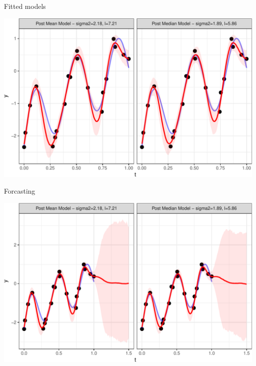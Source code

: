 \documentclass[11pt,ignorenonframetext,]{beamer}
\begin{document}
\begin{frame}{%
\protect\hypertarget{fitted-models}{%
Fitted models}}

\begin{center}\includegraphics[width=\textwidth]{Lec12_files/figure-beamer/unnamed-chunk-20-1} \end{center}

\end{frame}

\begin{frame}{%
\protect\hypertarget{forcasting}{%
Forcasting}}

\begin{center}\includegraphics[width=\textwidth]{Lec12_files/figure-beamer/unnamed-chunk-21-1} \end{center}

\end{frame}
\end{document}
